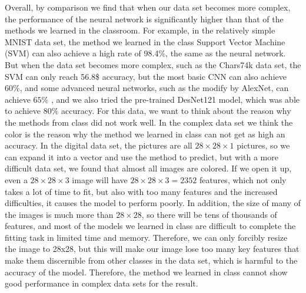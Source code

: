 \documentclass{article}
\begin{document}
\begin{multicols}{2}
Overall, by comparison we find that when our data set becomes more complex, the performance of the neural network is significantly higher than that of the methods we learned in the classroom. For example, in the relatively simple MNIST data set, the method we learned in the class Support Vector Machine (SVM) can also achieve a high rate of 98.4\%, the same as the neural network. But when the data set becomes more complex, such as the Chars74k data set, the SVM can only reach 56.8\$ accuracy, but the most basic CNN can also achieve $60\%$, and some advanced neural networks, such as the modify by AlexNet, can achieve $65\%$ , and we also tried the pre-trained DesNet121 model, which was able to achieve $80\%$ accuracy. For this data, we want to think about the reason why the methods from class did not work well. In the complex data set we think the color is the reason why the method we learned in class can not get as high an accuracy. In the digital data set, the pictures are all $28\times 28\times 1$ pictures, so we can expand it into a vector and use the method to predict, but with a more difficult data set, we found that almost all images are colored. If we open it up, even a $28\times 28\times 3$ image will have $28\times28\times3 = 2352$ features, which not only takes a lot of time to fit, but also with too many features and the increased difficulties, it causes the model to perform poorly. In addition, the size of many of the images is much more than $28\times 28$, so there will be tens of thousands of features, and most of the models we learned in class are difficult to complete the fitting task in limited time and memory. Therefore, we can only forcibly resize the image to 28x28, but this will make our image lose too many key features that make them discernible from other classes in the data set, which is harmful to the accuracy of the model. Therefore, the method we learned in class cannot show good performance in complex data sets for the result.
\end{multicols}
\end{document}
